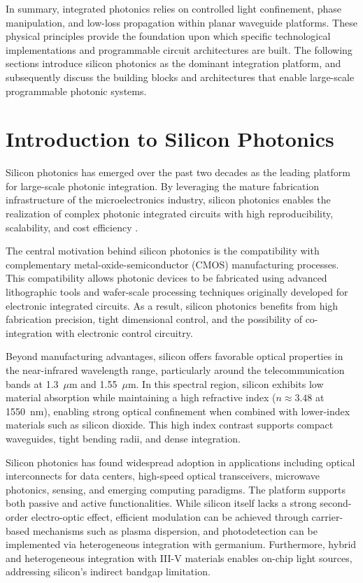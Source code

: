 In summary, integrated photonics relies on controlled light confinement, phase manipulation, and 
low-loss propagation within planar waveguide platforms. These physical principles provide the 
foundation upon which specific technological implementations and programmable circuit architectures 
are built. The following sections introduce silicon photonics as the dominant integration platform, 
and subsequently discuss the building blocks and architectures that enable large-scale programmable 
photonic systems.




\section{Introduction to Silicon Photonics} \label{sec:silicon_photonics}

Silicon photonics has emerged over the past two decades as the leading platform for large-scale 
photonic integration. By leveraging the mature fabrication infrastructure of the microelectronics 
industry, silicon photonics enables the realization of complex photonic integrated circuits
with high reproducibility, scalability, and cost efficiency 
\cite{sorefPresentFutureSilicon2006,thomsonRoadmapSiliconPhotonics2016}.

The central motivation behind silicon photonics is the compatibility with complementary 
metal-oxide-semiconductor (CMOS) manufacturing processes. This compatibility allows photonic 
devices to be fabricated using advanced lithographic tools and wafer-scale processing techniques 
originally developed for electronic integrated circuits. As a result, silicon photonics benefits 
from high fabrication precision, tight dimensional control, and the possibility of co-integration 
with electronic control circuitry.

Beyond manufacturing advantages, silicon offers favorable optical properties in the near-infrared 
wavelength range, particularly around the telecommunication bands at 1.3~$\mu$m and 1.55~$\mu$m. 
In this spectral region, silicon exhibits low material absorption while maintaining a high 
refractive index ($n \approx 3.48$ at 1550~nm), enabling strong optical confinement when combined 
with lower-index materials such as silicon dioxide. This high index contrast supports compact 
waveguides, tight bending radii, and dense integration.

Silicon photonics has found widespread adoption in applications including optical interconnects 
for data centers, high-speed optical transceivers, microwave photonics, sensing, and emerging 
computing paradigms. The platform supports both passive and active functionalities. While silicon 
itself lacks a strong second-order electro-optic effect, efficient modulation can be achieved 
through carrier-based mechanisms such as plasma dispersion, and photodetection can be implemented 
via heterogeneous integration with germanium. Furthermore, hybrid and heterogeneous integration 
with III-V materials enables on-chip light sources, addressing silicon's indirect bandgap limitation.

